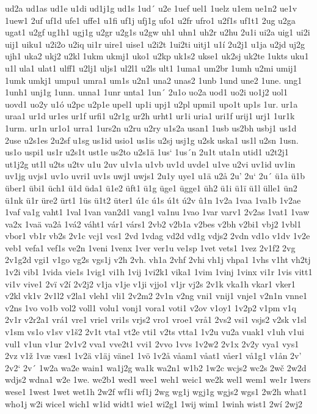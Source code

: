ud2a
ud1as
ud1e
u1di
ud1j1g
ud1s
1ud´
u2e
1uef
uel1
1uelz
u1em
ue1n2
ue1v
1uew1
2uf
uf1d
ufe1
uffe1
u1fi
uf1j
ufj1g
ufo1
u2fr
ufro1
u2f1s
uf1t1
2ug
u2ga
ugat1
u2gf
ug1h1
ugj1g
u2gr
u2g1s
u2gw
uh1
uhn1
uh2r
u2hu
2u1i
ui2a
uig1
ui2i
uij1
uiku1
u2i2o
u2iq
ui1r
uire1
uise1
u2i2t
1ui2ti
uitj1
u1í
2u2j1
u1ja
u2jd
uj2g
ujh1
uka2
ukj2
u2kl
1ukm
ukmj1
uko1
u2kp
uk1s2
ukse1
uk2sj
uk2te
1ukts
uku1
u1l
ula1
ulat1
ulff1
u2lj1
uljs1
ul2l1
u2ls
ult1
1uma1
um2br
1umh
u2mi
umij1
1umk
umkj1
umpu1
umra1
um1s
u2n1
una2
unas2
1unb
1und
une2
1une.
ung1
1unh1
unj1g
1unn.
unna1
1unr
unta1
1un´
2u1o
uo2a
uod1
uo2i
uo1j2
uol1
uovd1
uo2y
u1ó
u2pc
u2p1e
upel1
up1i
upj1
u2pl
upmi1
upo1t
up1s
1ur.
ur1a
uraa1
ur1d
ur1es
ur1f
urfi1
u2r1g
ur2h
urht1
ur1i
uria1
uri1f
urij1
urj1
1ur1k
1urm.
ur1n
ur1o1
urra1
1urs2n
u2ru
u2ry
u1s2a
usan1
1usb
us2bh
usbj1
us1d
2use
u2s1es
2u2sf
u1sg
us1id
usio1
us1is
u2sj
usj1g
u2sk
uska1
us1l
u2sn
1usn.
us1o
uspi1
us1r
u2s1t
ust1e
us2to
u2s1ä
1us`
1us´n
2u1t
uta1n
utid1
u2t2j1
ut1j2g
ut1l
u2ts
u2tv
u1u
2uv
u1v1a
u1vb
uv1d
uvde1
u1ve
u2vi
uv1id
uv1in
uv1jg
uvjs1
uv1o
uvri1
uv1s
uwj1
uwjs1
2u1y
uye1
u1ä
u2å
2u'
2u`
2u´
ü1a
ü1b
über1
übi1
üch1
ü1d
üda1
ü1e2
üft1
ü1g
üge1
ügge1
üh2
ü1i
ü1ï
ü1l
ülle1
ün2
ü1nk
ü1r
üre2
ürt1
1üs
ü1t2
üter1
ú1c
ú1s
ú1t
ú2v
û1n
1v2a
1vaa
1va1b
1v2ae
1vaf
va1g
vaht1
1val
1van
van2d1
vang1
va1nu
1vao
1var
varv1
2v2as
1vat1
1vaw
va2x
1vaä
va2å
1vá2
váht1
vár1
várs1
2vb2
v2b1a
v2bes
v2bh
v2bi1
vbj2
1vbl1
vbor1
vb1r
vb2s
2v1c
vcj1
vcs1
2vd
1vdag
vd2d
vd1g
vdjs2
2vdn
vd1o
v1dv
1v2e
veb1
vefa1
vef1s
ve2n
1veni
1venx
1ver
ver1u
ve1sp
1vet
vets1
1vez
2v1f2
2vg
2v1g2d
vgi1
v1go
vg2s
vgs1j
v2h
2vh.
vh1a
2vhf
2vhi
vh1j
vhpa1
1vhs
v1ht
vh2tj
1v2i
vib1
1vida
vie1s
1vig1
vi1h
1vij
1vi2k1
vika1
1vim
1vinj
1vinx
vi1r
1vis
vitt1
vi1v
vive1
2vï
v2í
2v2j2
v1ja
v1je
v1ji
vjjo1
v1jr
vj2s
2v1k
vka1h
vkar1
vker1
v2kl
vk1v
2v1l2
v2la1
vleh1
vli1
2v2m2
2v1n
v2ng
vni1
vnij1
vnje1
v2n1n
vnne1
v2ns
1vo
vo1b
vol2
voll1
volu1
vonj1
vora1
voti1
v2ov
v1oy1
1v2p2
v1pm
v1q
2v1r
v2r2a1
vrá1
vre1
vrie1
vri1s
vrjs2
vro1
vroe1
vrå1
2vs2
vsi1
vsjs2
v2sk
v1sl
v1sm
vs1o
v1sv
v1š2
2v1t
vta1
vt2e
vti1
v2ts
vtta1
1v2u
vu2a
vuak1
v1uh
v1ui
vul1
v1un
v1ur
2v1v2
vva1
vve2t1
vvi1
2vvo
1vvs
1v2w2
2v1x
2v2y
vya1
vys1
2vz
v1ž
1væ
væs1
1v2ä
v1äj
väne1
1vö
1v2å
våam1
våat1
våer1
vå1g1
v1ån
2v'
2v2`
2v´
1w2a
wa2e
wain1
wa1j2g
wa1k
wa2n1
w1b2
1w2c
wcjs2
wc2s
2wč
2w2d
wdjs2
wdna1
w2e
1we.
we2b1
wed1
wee1
weh1
weic1
we2k
wel1
wem1
we1r
1wers
wese1
1west
1wet
wet1h
2w2f
wf1i
wf1j
2wg
wg1j
wgj1g
wgjs2
wgs1
2w2h
what1
who1j
w2i
wice1
wich1
w1id
widt1
wie1
wi2g1
1wij
wim1
1winh
wist1
2wí
2wj2
